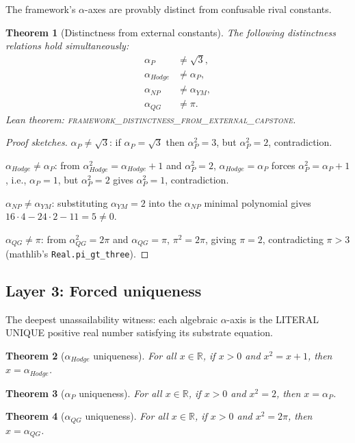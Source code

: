 \documentclass[11pt,a4paper]{amsart}
\theoremstyle{plain}
\newtheorem{theorem}{Theorem}[section]
\theoremstyle{definition}
\newcommand{\Rl}{\mathbb{R}}
\newcommand{\aP}{\alpha_{P}}
\newcommand{\aNP}{\alpha_{NP}}
\newcommand{\aYM}{\alpha_{YM}}
\newcommand{\aHodge}{\alpha_{Hodge}}
\newcommand{\aQG}{\alpha_{QG}}
\begin{document}
The framework's $\alpha$-axes are provably distinct from confusable
rival constants.

\begin{theorem}[Distinctness from external constants]
\label{thm:distinct}
The following distinctness relations hold simultaneously:
\begin{align*}
\aP &\neq \sqrt{3}, \\
\aHodge &\neq \aP, \\
\aNP &\neq \aYM, \\
\aQG &\neq \pi.
\end{align*}
Lean theorem:
\textsc{framework\_distinctness\_from\_external\_capstone}.
\end{theorem}

\begin{proof}[Proof sketches]
$\aP \neq \sqrt{3}$: if $\aP = \sqrt{3}$ then $\aP^{2} = 3$, but
$\aP^{2} = 2$, contradiction.

$\aHodge \neq \aP$: from $\aHodge^{2} = \aHodge + 1$ and $\aP^{2} = 2$,
$\aHodge = \aP$ forces $\aP^{2} = \aP + 1$, i.e., $\aP = 1$, but
$\aP^{2} = 2$ gives $\aP^{2} = 1$, contradiction.

$\aNP \neq \aYM$: substituting $\aYM = 2$ into the $\aNP$ minimal
polynomial gives $16 \cdot 4 - 24 \cdot 2 - 11 = 5 \neq 0$.

$\aQG \neq \pi$: from $\aQG^{2} = 2\pi$ and $\aQG = \pi$, $\pi^{2} = 2\pi$,
giving $\pi = 2$, contradicting $\pi > 3$ (mathlib's
\texttt{Real.pi\_gt\_three}).
\end{proof}

\subsection{Layer 3: Forced uniqueness}
\label{sec:uniqueness}

The deepest unassailability witness: each algebraic $\alpha$-axis is
the LITERAL UNIQUE positive real number satisfying its substrate
equation.

\begin{theorem}[$\aHodge$ uniqueness]
\label{thm:hodgeunique}
For all $x \in \Rl$, if $x > 0$ and $x^{2} = x + 1$, then $x = \aHodge$.
\end{theorem}

\begin{theorem}[$\aP$ uniqueness]
For all $x \in \Rl$, if $x > 0$ and $x^{2} = 2$, then $x = \aP$.
\end{theorem}

\begin{theorem}[$\aQG$ uniqueness]
For all $x \in \Rl$, if $x > 0$ and $x^{2} = 2\pi$, then $x = \aQG$.
\end{theorem}
\end{document}

